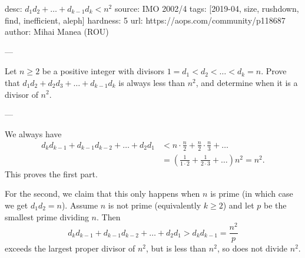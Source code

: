 desc: $d_1 d_2 + \dots + d_{k-1} d_k < n^2$
source: IMO 2002/4
tags: [2019-04, size, rushdown, find, inefficient, aleph]
hardness: 5
url: https://aops.com/community/p118687
author: Mihai Manea (ROU)

---

Let $n \ge 2$ be a positive integer
with divisors $1 = d_1 < d_2 < \dots < d_k = n$.
Prove that $d_1d_2 + d_2d_3 + \dots + d_{k-1} d_k$ is always less than $n^2$,
and determine when it is a divisor of $n^2$.

---

We always have
\begin{align*}
  d_k d_{k-1} + d_{k-1} d_{k-2} + \dots + d_2 d_1
  &< n \cdot \frac n2 + \frac n2 \cdot \frac n3 + \dots \\
  &= \left( \frac{1}{1 \cdot 2} + \frac{1}{2 \cdot 3} + \dots \right) n^2 = n^2.
\end{align*}
This proves the first part.

For the second, we claim that this only happens
when $n$ is prime (in which case we get $d_1 d_2 = n$).
Assume $n$ is not prime (equivalently $k \ge 2$)
and let $p$ be the smallest prime dividing $n$.
Then
\[ d_k d_{k-1} + d_{k-1} d_{k-2} + \dots + d_2 d_1
  > d_k d_{k-1} = \frac{n^2}{p} \]
exceeds the largest proper divisor of $n^2$,
but is less than $n^2$, so does not divide $n^2$.
